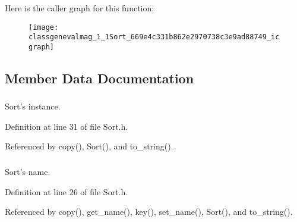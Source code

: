 Here is the caller graph for this function:\nopagebreak
\begin{figure}[H]
\begin{center}
\leavevmode
\texttt{[image: classgenevalmag\_1\_1Sort\_669e4c331b862e2970738c3e9ad88749\_icgraph]}
\end{center}
\end{figure}


\subsection{Member Data Documentation}
\hypertarget{classgenevalmag_1_1Sort_dc3a9ea4bfaabbb0879c18172f670ef8}{
\subsubsection[{s\_\-ins}]{}}
\label{classgenevalmag_1_1Sort_dc3a9ea4bfaabbb0879c18172f670ef8}


Sort's instance. 



Definition at line 31 of file Sort.h.

Referenced by copy(), Sort(), and to\_\-string().\hypertarget{classgenevalmag_1_1Sort_e6d8c2bf79cf548f731bbd4d7d9b1f4e}{
\subsubsection[{s\_\-name}]{}}
\label{classgenevalmag_1_1Sort_e6d8c2bf79cf548f731bbd4d7d9b1f4e}


Sort's name. 



Definition at line 26 of file Sort.h.

Referenced by copy(), get\_\-name(), key(), set\_\-name(), Sort(), and to\_\-string().\hypertarget{classgenevalmag_1_1Sort_063c9ca680a72b50a2018473d3be47c7}{
\subsubsection[{s\_\-type\_\-basic}]{}}
\label{classgenevalmag_1_1Sort_063c9ca680a72b50a2018473d3be47c7}


